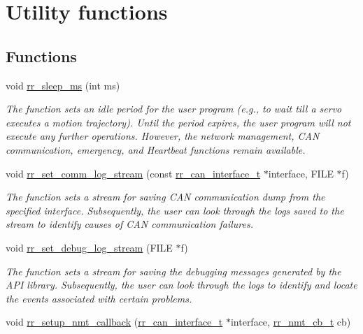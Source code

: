 \hypertarget{group___utils}{}\section{Utility functions}
\label{group___utils}
\subsection*{Functions}
\begin{DoxyCompactItemize}
\item 
void \hyperlink{group___utils_gaeb26028b83635e028ebc901e1cbf33a1}{rr\+\_\+sleep\+\_\+ms} (int ms)
\begin{DoxyCompactList}\small\item\em The function sets an idle period for the user program (e.\+g., to wait till a servo executes a motion trajectory). Until the period expires, the user program will not execute any further operations. However, the network management, C\+AN communication, emergency, and Heartbeat functions remain available. \end{DoxyCompactList}\item 
void \hyperlink{group___utils_gaea43ac88d4b935bb3850a69a17462d31}{rr\+\_\+set\+\_\+comm\+\_\+log\+\_\+stream} (const \hyperlink{structrr__can__interface__t}{rr\+\_\+can\+\_\+interface\+\_\+t} $\ast$interface, F\+I\+LE $\ast$f)
\begin{DoxyCompactList}\small\item\em The function sets a stream for saving C\+AN communication dump from the specified interface. Subsequently, the user can look through the logs saved to the stream to identify causes of C\+AN communication failures. \end{DoxyCompactList}\item 
void \hyperlink{group___utils_ga74cb6dc4d15701eaf5c6fd84b1325fc9}{rr\+\_\+set\+\_\+debug\+\_\+log\+\_\+stream} (F\+I\+LE $\ast$f)
\begin{DoxyCompactList}\small\item\em The function sets a stream for saving the debugging messages generated by the A\+PI library. Subsequently, the user can look through the logs to identify and locate the events associated with certain problems. \end{DoxyCompactList}\item 
void \hyperlink{group___utils_ga2433f49950ad40f06537287b52852c13}{rr\+\_\+setup\+\_\+nmt\+\_\+callback} (\hyperlink{structrr__can__interface__t}{rr\+\_\+can\+\_\+interface\+\_\+t} $\ast$interface, \hyperlink{api_8h_ae0f9f2b200672126bb1f6eb3e66c27fc}{rr\+\_\+nmt\+\_\+cb\+\_\+t} cb)

\end{DoxyCompactItemize}
